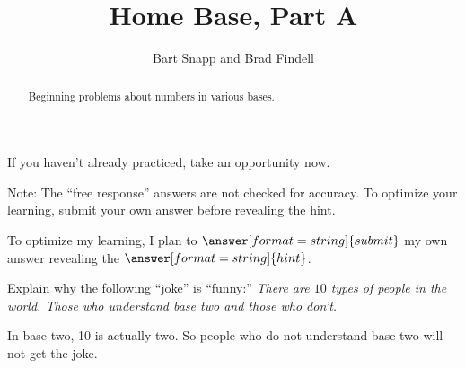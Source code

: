 \documentclass[nooutcomes]{ximera}
\title{Home Base, Part A}
\author{Bart Snapp and Brad Findell}
\begin{document}
\begin{abstract}
Beginning problems about numbers in various bases. 
\end{abstract}
\maketitle

%
%

If you haven't already practiced, take an opportunity now.  

\begin{center}
\end{center}

\begin{center}
\end{center}

Note:  The ``free response'' answers are not checked for accuracy.  To optimize your learning, submit your own answer before revealing the hint.  

\begin{problem}
To optimize my learning, I plan to $\answer[format=string]{submit}$ my own answer  revealing the $\answer[format=string]{hint}$.  
\end{problem}

\begin{problem}Explain why the following ``joke'' is ``funny:'' \textit{There
  are $10$ types of people in the world. Those who understand base two
  and those who don't.}
\begin{freeResponse}
\begin{hint}
In base two, 10 is actually two.  So people who do not understand base two will not get the joke.  
\end{hint}
\end{freeResponse}
\end{problem} 
\end{document}
